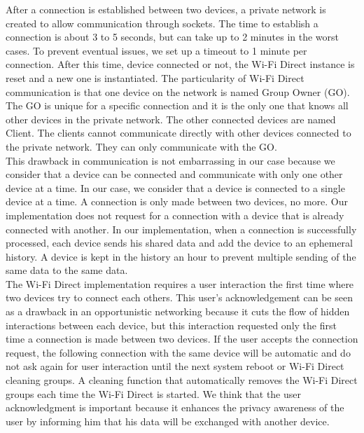 After a connection is established between two devices, a private network is created to allow communication through sockets.
The time to establish a connection is about 3 to 5 seconds, but can take up to 2 minutes in the worst cases.
To prevent eventual issues, we set up a timeout to 1 minute per connection.
After this time, device connected or not, the Wi-Fi Direct instance is reset and a new one is instantiated.
The particularity of Wi-Fi Direct communication is that one device on the network is named Group Owner (GO).
The GO is unique for a specific connection and it is the only one that knows all other devices in the private network.
The other connected devices are named Client.
The clients cannot communicate directly with other devices connected to the private network.
They can only communicate with the GO.
\\

This drawback in communication is not embarrassing in our case because we consider that a device can be connected and communicate with only one other device at a time.
In our case, we consider that a device is connected to a single device at a time.
A connection is only made between two devices, no more.
Our implementation does not request for a connection with a device that is already connected with another.
In our implementation, when a connection is successfully processed, each device sends his shared data and add the device to an ephemeral history.
A device is kept in the history an hour to prevent multiple sending of the same data to the same data.
\\

The Wi-Fi Direct implementation requires a user interaction the first time where two devices try to connect each others.
This user's acknowledgement can be seen as a drawback in an opportunistic networking because it cuts the flow of hidden interactions between each device, but this interaction requested only the first time a connection is made between two devices.
If the user accepts the connection request, the following connection with the same device will be automatic and do not ask again for user interaction until the next system reboot or Wi-Fi Direct cleaning groups.
A cleaning function that automatically removes the Wi-Fi Direct groups each time the Wi-Fi Direct is started.
We think that the user acknowledgment is important because it enhances the privacy awareness of the user by informing him that his data will be exchanged with another device.
\\


